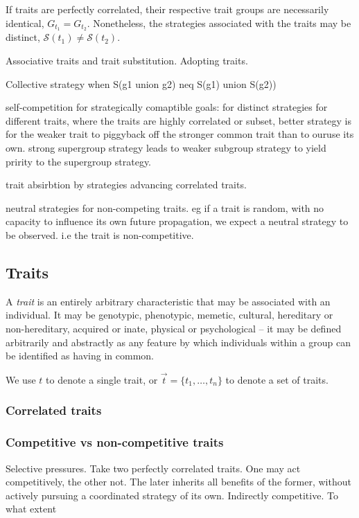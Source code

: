 \documentclass[aps,rmp,twocolumn,amsmath,amssymb,nofootinbib,superscriptaddress]{revtex4}
\begin{document}
If traits are perfectly correlated, their respective trait groups are necessarily identical, $G_{t_1}=G_{t_2}$. Nonetheless, the strategies associated with the traits may be distinct, $\mathcal{S}(t_1)\neq\mathcal{S}(t_2)$.

Associative traits and trait substitution. Adopting traits.

Collective strategy when S(g1 union g2) neq S(g1) union S(g2))

self-competition for strategically comaptible goals:
for distinct strategies for different traits, where the traits are highly correlated or subset, better strategy is for the weaker trait to piggyback off the stronger common trait than to ouruse its own. strong supergroup strategy leads to weaker subgroup strategy to yield pririty to the supergroup strategy.

trait absirbtion by strategies advancing correlated traits. 

neutral strategies for non-competing traits. eg if a trait is random, with no capacity to influence its own future propagation, we expect a neutral strategy to be observed. i.e the trait is non-competitive.

\subsection{Traits}

A \textit{trait} is an entirely arbitrary characteristic that may be associated with an individual. It may be genotypic, phenotypic, memetic, cultural, hereditary or non-hereditary, acquired or inate, physical or psychological -- it may be defined arbitrarily and abstractly as any feature by which individuals within a group can be identified as having in common.

We use $t$ to denote a single trait, or $\vec t=\{t_1,\dots,t_n\}$ to denote a set of traits.

\subsubsection{Correlated traits}

\subsubsection{Competitive vs non-competitive traits}

Selective pressures. Take two perfectly correlated traits. One may act competitively, the other not. The later inherits all benefits of the former, without actively pursuing a coordinated strategy of its own. Indirectly competitive. To what extent 
\end{document}
